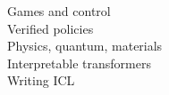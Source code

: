 Games and control \citep{ax2611_21449,ax2611_09271,ax2611_16981}\\ Verified policies \citep{ax2611_11604}\\ Physics, quantum, materials \citep{ax2611_12954,ax2611_11537,ax2611_22013}\\ Interpretable transformers \citep{ax2611_18114}\\ Writing ICL \citep{ax2611_26841}
